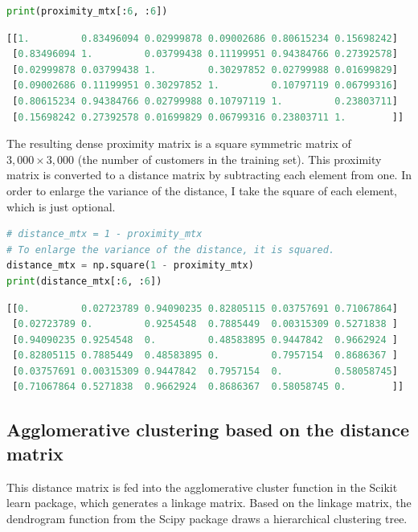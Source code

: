 \documentclass{article}
\begin{document}
\begin{lstlisting}[language=Python]
print(proximity_mtx[:6, :6])
\end{lstlisting}

\begin{lstlisting}[language=Python,numbers=none]
[[1.         0.83496094 0.02999878 0.09002686 0.80615234 0.15698242]
 [0.83496094 1.         0.03799438 0.11199951 0.94384766 0.27392578]
 [0.02999878 0.03799438 1.         0.30297852 0.02799988 0.01699829]
 [0.09002686 0.11199951 0.30297852 1.         0.10797119 0.06799316]
 [0.80615234 0.94384766 0.02799988 0.10797119 1.         0.23803711]
 [0.15698242 0.27392578 0.01699829 0.06799316 0.23803711 1.        ]]
\end{lstlisting}

The resulting dense proximity matrix is a square symmetric matrix of $3,000 \times 3,000$ (the number of customers in the training set). This proximity matrix is converted to a distance matrix by subtracting each element from one. In order to enlarge the variance of the distance, I take the square of each element, which is just optional.

\begin{lstlisting}[language=Python]
# distance_mtx = 1 - proximity_mtx
# To enlarge the variance of the distance, it is squared.
distance_mtx = np.square(1 - proximity_mtx)
print(distance_mtx[:6, :6])
\end{lstlisting}

\begin{lstlisting}[language=Python,numbers=none]
[[0.         0.02723789 0.94090235 0.82805115 0.03757691 0.71067864]
 [0.02723789 0.         0.9254548  0.7885449  0.00315309 0.5271838 ]
 [0.94090235 0.9254548  0.         0.48583895 0.9447842  0.9662924 ]
 [0.82805115 0.7885449  0.48583895 0.         0.7957154  0.8686367 ]
 [0.03757691 0.00315309 0.9447842  0.7957154  0.         0.58058745]
 [0.71067864 0.5271838  0.9662924  0.8686367  0.58058745 0.        ]]
\end{lstlisting}

\subsection{Agglomerative clustering based on the distance matrix}

This distance matrix is fed into the agglomerative cluster function in the Scikit learn package, which generates a linkage matrix. Based on the linkage matrix, the dendrogram function from the Scipy package draws a hierarchical clustering tree. 
\end{document}
